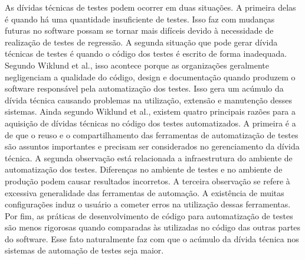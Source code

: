 As dívidas técnicas de testes podem ocorrer em duas situações. A primeira delas é quando há uma quantidade insuficiente de testes. Isso faz com mudanças futuras no software possam se tornar mais difíceis devido à necessidade de realização de testes de regressão. A segunda situação que pode gerar dívida técnicas de testes é quando o código dos testes é escrito de forma inadequada. Segundo Wiklund et al.\cite{wiklund2012technical}, isso acontece porque as organizações geralmente negligenciam a qualidade do código, design e documentação quando produzem o software responsável pela automatização dos testes. Isso gera um acúmulo da dívida técnica causando problemas na utilização, extensão e manutenção desses sistemas.  Ainda segundo  Wiklund et al., existem quatro principais razões para a aquisição de dívidas técnicas no código dos testes automatizados. A primeira é a de que o reuso e o compartilhamento das ferramentas de automatização de testes são assuntos importantes e precisam ser considerados no gerenciamento da dívida técnica. A segunda observação está relacionada a infraestrutura do ambiente de automatização dos testes. Diferenças no ambiente de testes e no ambiente de produção podem causar resultados incorretos. A terceira observação se refere à excessiva generalidade das ferramentas de automação. A existência de muitas configurações induz o usuário a cometer erros na utilização dessas ferramentas. Por fim, as práticas de desenvolvimento de código para automatização de testes são menos rigorosas quando comparadas às utilizadas no código das outras partes do software. Esse fato naturalmente faz com que o acúmulo da dívida técnica nos sistemas de automação de testes seja maior. 

